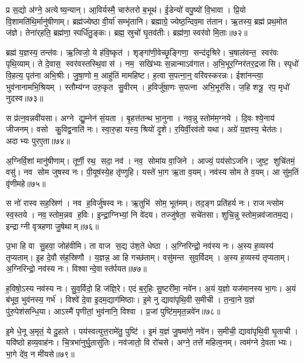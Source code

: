 प्र स॒द्यो अ॑ग्ने॒ अत्येष्य॒न्यान्।
आ॒विर्यस्मै॒ चारु॑तरो ब॒भूथ॑।
ई॒डेन्यो॑ वपु॒ष्यो॑ वि॒भावा।
प्रि॒यो वि॒शामति॑थि॒र्मानु॑षीणाम्।
ब्रह्म॑ज्येष्ठा वी॒र्या॑ सम्भृ॑तानि।
ब्रह्माग्रे॒ ज्येष्ठ॒न्दिव॒मा त॑तान।
ऋ॒तस्य॒ ब्रह्म॑ प्रथ॒मोत ज॑ज्ञे।
तेना॑र्‌हति॒ ब्रह्म॑णा॒ स्पर्धि॑तु॒ङ्कः।
ब्रह्म॒ स्रुचो॑ घृ॒तव॑तीः।
ब्रह्म॑णा॒ स्वर॑वो मि॒ताः॥७२॥

ब्रह्म॑ य॒ज्ञस्य॒ तन्त॑वः।
ऋ॒त्विजो॒ ये ह॑वि॒ष्कृत॑।
शृङ्गा॑णी॒वेच्छृ॒ङ्गिणा॒ सन्द॑दृश्रिरे।
च॒षाल॑वन्त॒ स्वर॑वः पृथि॒व्याम्।
ते दे॒वास॒ स्वर॑वस्तस्थि॒वास॑।
नम॒ सखि॑भ्यः स॒न्नान्माऽव॑गात।
अ॒भि॒भूर॒ग्निर॑तर॒द्रजासि।
स्पृधो॑ वि॒हत्य॒ पृत॑ना अभि॒श्रीः।
जु॒षा॒णो म॒ आहु॑तिं मामहिष्ट।
ह॒त्वा स॒पत्ना॒न्॒ वरि॑वस्करन्नः।
ईशा॑नन्त्वा॒ भुव॑नानामभि॒श्रियम्।
स्तौम्य॑ग्न उरु॒कृत सु॒वीरम्।
ह॒विर्जु॑षा॒णः स॒पत्ना अभि॒भूर॑सि।
ज॒हि शत्रू॒ रप॒ मृधो॑ नुदस्व॥७३॥\anuvakamend[वि॒शां ज॑यामसि जीरदानो॒ हर्या॒ विश्वा॒ दिवि॑ष्टिषु॒ वसू॑नि जिगी॒वान्त्सहो॑भिर्मि॒ता न॑श्च॒त्वारि॑ च]

स प्र॑त्न॒वन्नवी॑यसा।
अग्ने द्यु॒म्नेन॑ सं॒यता।
बृ॒हत्त॑तन्थ भा॒नुना।
नव॒न्नु स्तोम॑म॒ग्नये।
दि॒वः श्ये॒नाय॑ जीजनम्।
वसो कु॒विद्व॒नाति॑ नः।
स्वा॒रु॒हा यस्य॒ श्रियो॑ दृ॒शे।
र॒यिर्वी॒रव॑तो यथा।
अग्रे॑ य॒ज्ञस्य॒ चेत॑तः।
अदाभ्यः पुरए॒ता॥७४॥

अ॒ग्निर्वि॒शां मानु॑षीणाम्।
तूर्णी॒ रथ॒ सदा॒ नव॑।
नव॒ सोमा॑य वा॒जिने।
आज्यं॒ पय॑सोऽजनि।
जुष्ट॒ शुचि॑तमं॒ वसु॑।
नव सोम जुषस्व नः।
पी॒यूष॑स्ये॒ह तृ॑प्णुहि।
यस्ते॑ भा॒ग ऋ॒ता व॒यम्।
नव॑स्य सोम ते व॒यम्।
आ सु॑म॒तिं वृ॑णीमहे॥७५॥

स नो॑ रास्व सह॒स्रिण॑।
नव ह॒विर्जु॑षस्व नः।
ऋ॒तुभि॑ सोम॒ भूत॑मम्।
तद॒ङ्ग प्रति॑हर्य नः।
राजन्त्सोम स्व॒स्तये।
नव॒स्तोम॒न्नव ह॒विः।
इ॒न्द्रा॒ग्निभ्यां॒ नि वे॑दय।
तज्जु॑षेता॒ सचे॑तसा।
शुचि॒न्नु स्तोम॒न्नव॑जातम॒द्य।
इन्द्राग्नी वृत्रहणा जु॒षेथाम्॥७६॥

उ॒भा हि वा सु॒हवा॒ जोह॑वीमि।
ता वाज स॒द्य उ॑श॒ते धेष्ठा।
अ॒ग्निरिन्द्रो॒ नव॑स्य नः।
अ॒स्य ह॒व्यस्य॑ तृप्यताम्।
इ॒ह दे॒वौ स॑ह॒स्रिणौ।
य॒ज्ञन्न॒ आ हि गच्छ॑ताम्।
वसु॑मन्त सुव॒र्विदम्।
अ॒स्य ह॒व्यस्य॑ तृप्यताम्।
अ॒ग्निरिन्द्रो॒ नव॑स्य नः।
विश्वान्दे॒वास्त॑र्पयत॥७७॥

ह॒विषो॒ऽस्य नव॑स्य नः।
सु॒व॒र्विदो॒ हि ज॑ज्ञि॒रे।
एदं ब॒र्॒हिः सु॒ष्टरी॑मा॒ नवे॑न।
अ॒यं य॒ज्ञो यज॑मानस्य भा॒गः।
अ॒यं ब॑भूव॒ भुव॑नस्य॒ गर्भ॑।
विश्वे॑ दे॒वा इ॒दम॒द्याग॑मिष्ठाः।
इ॒मे नु द्यावा॑पृथि॒वी स॒मीची।
त॒न्वा॒ने य॒ज्ञं पु॑रु॒पेश॑सन्धि॒या।
आऽस्मै॑ पृणीतां॒ भुव॑नानि॒ विश्वा।
प्र॒जां पुष्टि॑म॒मृत॒न्नवे॑न॥७८॥

इ॒मे धे॒नू अ॒मृतं॒ ये दु॒हाते।
पय॑स्वत्युत्त॒रामे॑तु॒ पुष्टि॑।
इ॒मं य॒ज्ञं जु॒षमा॑णे॒ नवे॑न।
स॒मीची॒ द्यावा॑पृथि॒वी घृ॒ताची।
यवि॑ष्ठो हव्य॒वाह॑नः।
चि॒त्रभा॑नुर्घु॒तासु॑तिः।
नव॑जातो॒ वि रो॑चसे।
अग्ने॒ तत्ते॑ महित्व॒नम्।
त्वम॑ग्ने दे॒वताभ्यः।
भा॒गे दे॑व॒ न मी॑यसे॥७९॥

